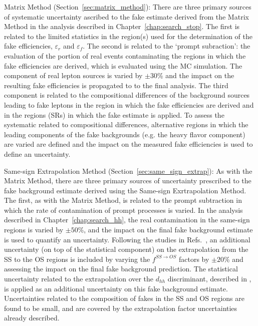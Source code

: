 \begin{description}
    \item{Matrix Method (Section~\ref{sec:matrix_method}):} There are three primary sources of systematic
        uncertainty ascribed to the fake estimate derived from the Matrix Method in the analysis described
        in Chapter~\ref{chap:search_stop}.
        The first is related to the limited statistics in the region(s) used for the determination of the
        fake efficiencies, $\varepsilon_r$ and $\varepsilon_f$.
        The second is related to the `prompt subraction': the evaluation of the portion of real events contaminating the
        regions in which the fake efficiencies are derived, which is evaluated using the MC simulation.       
        The component of real lepton sources is varied by $\pm 30$\% and the impact on the resulting
        fake efficiencies is propagated to to the final analysis. 
        The third component is related to the compositional differences of the background sources leading
        to fake leptons in the region in which the fake efficiencies are derived and in the regions (SRs)
        in which the fake estimate is applied.
        To assess the systematic related to compositional differences, alternative regions in which the leading
        components of the fake backgrounds (e.g. the heavy flavor component) are varied are defined and the impact on the measured fake efficiencies
        is used to define an uncertainty.
    \item{Same-sign Extrapolation Method (Section~\ref{sec:same_sign_extrap}):} As with the Matrix Method,
        there are three primary sources of uncertainty prescribed to the fake background estimate derived using
        the Same-sign Exrtrapolation Method. The first, as with the Matrix Method, is related to the prompt subtraction
        in which the rate of contamination of prompt processes is varied.
        In the analysis described in Chapter~\ref{chap:search_hh}, the real contamination in the same-sign
        regions is varied by $\pm 50$\%, and the impact on the final fake background estimate is used to quantify
        an uncertainty.
        Following the studies in Refs.~\cite{TOPQ-2015-09,TOPQ-2017-05}, an additional uncertainty (on top of the statistical component) on the
        extrapolation from the SS to the OS regions is included by varying the $f^{SS \rightarrow OS}$ factors
        by $\pm 20$\% and assessing the impact on the final fake background prediction.
        The statistical uncertainty related to the extrapolation over the $d_{hh}$ discriminant,
        described in {\color{red}{Section XXX}}, is applied as an additional uncertainty on this fake background estimate.
        Uncertainties related to the composition of fakes in the SS and OS regions are found to be small,
        and are covered by the extrapolation factor uncertainties already described.
\end{description}



